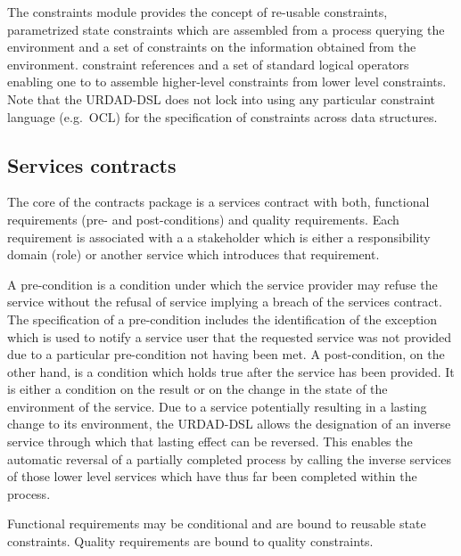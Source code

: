 The constraints module provides the concept of re-usable constraints, parametrized state constraints which are assembled from a process querying the environment and a set of constraints on the information obtained from the environment. constraint references and a set of standard logical operators enabling one to to assemble higher-level constraints from lower level constraints. Note that the URDAD-DSL does not lock into using any particular constraint language (e.g.\ OCL) for the specification of constraints across data structures.


\subsection{Services contracts}

The core of the contracts package is a services contract with both, functional requirements (pre- and post-conditions) and quality requirements. Each requirement is associated with a a stakeholder which is either a responsibility domain (role) or another service which introduces that requirement. 

A pre-condition is a condition under which the service provider may refuse the service without the refusal of service implying a breach of the services contract. The specification of a pre-condition includes the identification of the exception which is used to notify a service user that the requested service was not provided due to a particular pre-condition not having been met. A post-condition, on the other hand, is a condition which holds true after the service has been provided. It is either a condition on the result or on the change in the state of the environment of the service. Due to a service potentially resulting in a lasting change to its environment, the URDAD-DSL allows the designation of an inverse service through which that lasting effect can be reversed. This enables the automatic reversal of a partially completed process by calling the inverse services of those lower level services which have thus far been completed within the process.

Functional requirements may be conditional and are bound to reusable state constraints.  Quality requirements are bound to quality constraints.

